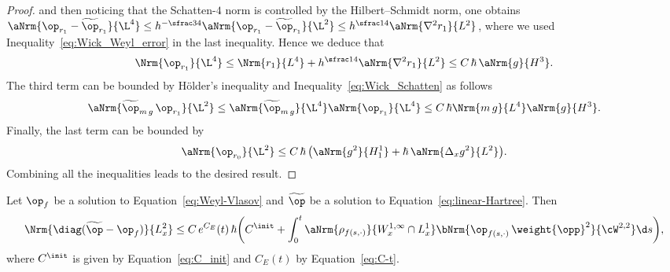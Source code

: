 \begin{proof}
and then noticing that the Schatten-$4$ norm is controlled by the Hilbert--Schmidt norm, one obtains $\aNrm{\op_{r_1} - \widetilde{\op}_{r_1}}{\L^4} \leq h^{-\sfrac34} \aNrm{\op_{r_1} - \widetilde{\op}_{r_1}}{\L^2} \leq h^{\sfrac14} \aNrm{\nabla^2 r_1}{L^2}$, where we used Inequality~\eqref{eq:Wick_Weyl_error} in the last inequality. Hence we deduce that
\begin{equation*}
\Nrm{\op_{r_1}}{\L^4} \leq \Nrm{r_1}{L^4} + h^{\sfrac14} \aNrm{\nabla^2 r_1}{L^2} \leq C\,\hbar\, \aNrm{g}{H^3}.
\end{equation*}
The third term can be bounded by Hölder's inequality and Inequality~\eqref{eq:Wick_Schatten} as follows
\begin{equation*}
\aNrm{\widetilde{\op}_{m\,g} \, \op_{r_1}}{\L^2} \leq \aNrm{\widetilde{\op}_{m\,g}}{\L^4} \aNrm{\op_{r_1}}{\L^4} \leq C\,\hbar \Nrm{m\,g}{L^4} \aNrm{g}{H^3}.
\end{equation*}
Finally, the last term can be bounded by
\begin{align*}
\aNrm{\op_{r_0}}{\L^2} \le C\, \hbar\,\bigl(\aNrm{g^2}{H^1_1} + \hbar\,\aNrm{\Delta_x g^2}{L^2}\bigr).
\end{align*}
Combining all the inequalities leads to the desired result.
\end{proof}

\begin{lem}\label{lemma:diag-opt-opf}
Let $\op_f$ be a solution to Equation~\eqref{eq:Weyl-Vlasov} and $\widetilde{\op}$ be a solution to Equation~\eqref{eq:linear-Hartree}. Then
\begin{equation*}
\Nrm{\diag(\widetilde{\op}-\op_f)}{L^2_x} \leq C\, e^{C_E}(t)\, \hbar \biggl(C^\init+ \int^t_0 \aNrm{\rho_{f(s,\cdot)}}{W^{1,\infty}_x\cap L^1_x} \bNrm{\op_{f(s,\cdot)}\, \weight{\opp}^2}{\cW^{2,2}}\d s\biggr),
\end{equation*}
where $C^\init$ is given by Equation~\eqref{eq:C_init} and $C_E(t)$ by Equation~\eqref{eq:C-t}.
\end{lem}

